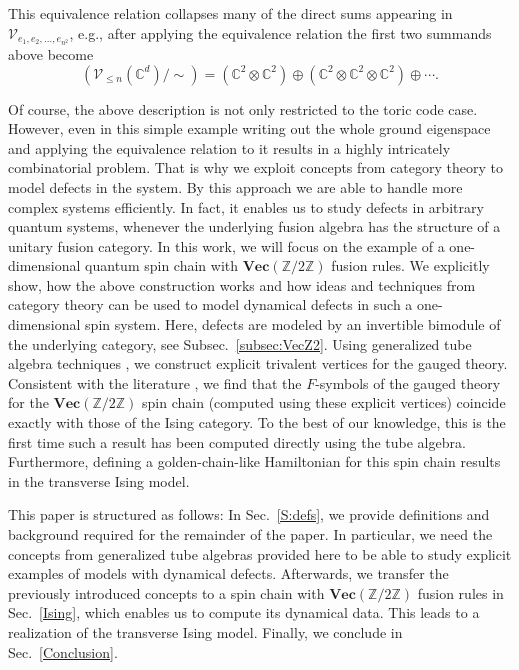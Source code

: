 \documentclass[aps,prb,twocolumn,superscriptaddress,noshowkeys]{revtex4-2}  %
\renewcommand{\Vec}{\textbf{Vec}}
\newcommand{\Z}{\mathbb{Z}}
\theoremstyle{plain}%
\theoremstyle{definition}
\theoremstyle{remark}
\begin{document}
This equivalence relation collapses many of the direct sums appearing in $\mathcal{V}_{e_1,e_2,\ldots,e_{n^2}}$, e.g., after applying the equivalence relation the first two summands above become
\begin{equation}
\left(\mathcal{V}_{\le n}(\mathbb{C}^d)/\sim\right) = (\mathbb{C}^2\otimes \mathbb{C}^2)\oplus (\mathbb{C}^2\otimes \mathbb{C}^2\otimes \mathbb{C}^2)\oplus \cdots.
\end{equation}

Of course, the above description is not only restricted to the toric code case. However, even in this simple example writing out the whole ground eigenspace and applying the equivalence relation to it results in a highly intricately combinatorial problem. That is why we exploit concepts from category theory to model defects in the system. By this approach we are able to handle more complex systems efficiently. In fact, it enables us to study defects in arbitrary quantum systems, whenever the underlying fusion algebra has the structure of a unitary fusion category. In this work, we will focus on the example of a one-dimensional quantum spin chain with $\Vec(\Z/2\Z)$ fusion rules. We explicitly show, how the above construction works and how ideas and techniques from category theory can be used to model dynamical defects in such a one-dimensional spin system. Here, defects are modeled by an invertible bimodule of the underlying category, see Subsec.~\ref{subsec:VecZ2}. Using generalized tube algebra techniques \cite{ocneanu}, we construct explicit trivalent vertices for the gauged theory. Consistent with the literature \cite{TY,ENO10,Bombin2010,BBCW14,WBV17}, we find that the $F$-symbols of the gauged theory for the $\Vec(\Z/2\Z)$ spin chain (computed using these explicit vertices) coincide exactly with those of the Ising category. To the best of our knowledge, this is the first time such a result has been computed directly using the tube algebra. Furthermore, defining a golden-chain-like Hamiltonian \cite{Feiguin2007} for this spin chain results in the transverse Ising model.

This paper is structured as follows: In Sec.~\ref{S:defs}, we provide definitions and background required for the remainder of the paper. In particular, we need the concepts from generalized tube algebras provided here to be able to study explicit examples of models with dynamical defects. Afterwards, we transfer the previously introduced concepts to a spin chain with $\Vec(\Z/2\Z)$ fusion rules in Sec.~\ref{Ising}, which enables us to compute its dynamical data. This leads to a realization of the transverse Ising model. Finally, we conclude in Sec.~\ref{Conclusion}.
\end{document}
